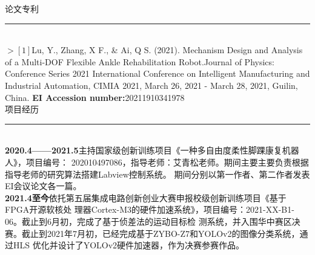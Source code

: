 \documentclass[UTF8]{ctexart}
\begin{document}
\noindent\faLeanpub\quad 论文专利\\
\rule[12pt]{16cm}{0.005em}\\[-12pt]
$>[1]${Lu, Y., Zhang, X F., & Ai, Q S. (2021).} Mechanism Design and Analysis of a Multi-DOF Flexible 
Ankle Rehabilitation Robot.Journal of Physics: Conference Series 2021 International Conference
 on Intelligent Manufacturing and Industrial Automation, CIMIA 2021, March 26, 2021 - March 28, 
 2021, Guilin, China.\hspace{16em}    \textbf{EI Accession number:}20211910341978\\[-10pt]


\noindent\faWrench\quad 项目经历\\
\rule[12pt]{16cm}{0.005em}\\[-12pt]
\textbf{2020.4——2021.5}\quad 主持国家级创新训练项目《一种多自由度柔性脚踝康复机器人》，项目编号：
202010497086，指导老师：艾青松老师。期间主要主要负责根据指导老师的研究算法搭建Labview控制系统。
期间分别以第一作者、第二作者发表EI会议论文各一篇。\\[10pt]
\textbf{2021.4至今}\quad 依托第五届集成电路创新创业大赛申报校级创新训练项目《基于FPGA开源软核处
理器Cortex-M3的硬件加速系统》，项目编号：2021-XX-B1-06。截止到6月初，完成了基于侦差法的运动目标检
测系统，并入围华中赛区决赛。截止到2021年7月初，已经完成基于ZYBO-Z7和YOLOv2的图像分类系统，通过HLS
优化并设计了YOLOv2硬件加速器，作为决赛参赛作品。\\
\end{document}
